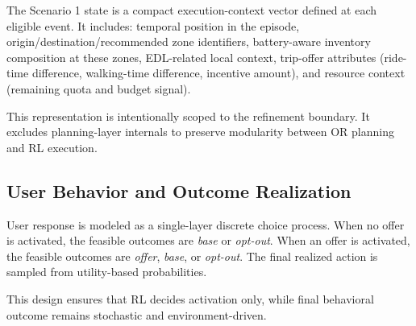 The Scenario 1 state is a compact execution-context vector defined at each eligible event. It includes: temporal position in the episode, origin/destination/recommended zone identifiers, battery-aware inventory composition at these zones, EDL-related local context, trip-offer attributes (ride-time difference, walking-time difference, incentive amount), and resource context (remaining quota and budget signal).

This representation is intentionally scoped to the refinement boundary. It excludes planning-layer internals to preserve modularity between OR planning and RL execution.

\subsection{User Behavior and Outcome Realization}

User response is modeled as a single-layer discrete choice process. When no offer is activated, the feasible outcomes are \textit{base} or \textit{opt-out}. When an offer is activated, the feasible outcomes are \textit{offer}, \textit{base}, or \textit{opt-out}. The final realized action is sampled from utility-based probabilities.

This design ensures that RL decides activation only, while final behavioral outcome remains stochastic and environment-driven.

